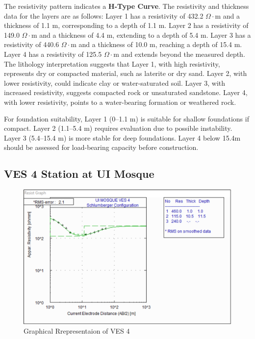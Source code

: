 \documentclass[12pt,a4paper]{report}
\begin{document}
The resistivity pattern indicates a \textbf{H-Type Curve}. The resistivity and thickness data for the layers are as follows: Layer 1 has a resistivity of 432.2 $\Omega\cdot$m and a thickness of 1.1 m, corresponding to a depth of 1.1 m. Layer 2 has a resistivity of 149.0 $\Omega\cdot$m and a thickness of 4.4 m, extending to a depth of 5.4 m. Layer 3 has a resistivity of 440.6 $\Omega\cdot$m and a thickness of 10.0 m, reaching a depth of 15.4 m. Layer 4 has a resistivity of 125.5 $\Omega\cdot$m and extends beyond the measured depth. The lithology interpretation suggests that Layer 1, with high resistivity, represents dry or compacted material, such as laterite or dry sand. Layer 2, with lower resistivity, could indicate clay or water-saturated soil. Layer 3, with increased resistivity, suggests compacted rock or unsaturated sandstone. Layer 4, with lower resistivity, points to a water-bearing formation or weathered rock.

For foundation suitability, Layer 1 (0--1.1 m) is suitable for shallow foundations if compact. Layer 2 (1.1--5.4 m) requires evaluation due to possible instability. Layer 3 (5.4--15.4 m) is more stable for deep foundations. Layer 4 below 15.4m should be assessed for load-bearing capacity before construction.

\subsection{VES 4 Station at UI Mosque}

\begin{figure}[H]
    \centering
    \includegraphics[width=1.0\textwidth]{ui_ves4.png}
    \caption{Graphical Rrepresentaion of VES 4}
    \label{fig:VES_4_Curve}
\end{figure}
\end{document}

